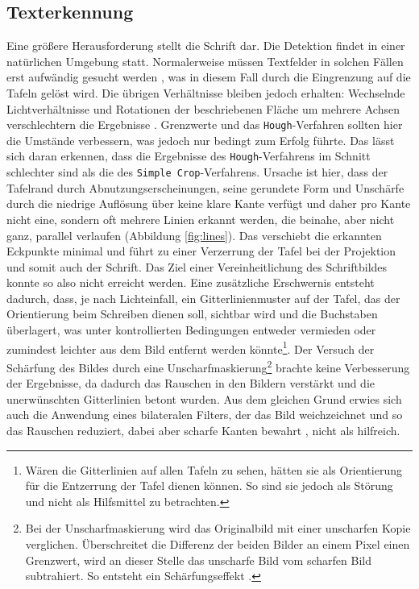 \subsection{Texterkennung}
\label{section:diskussiontexterkennung}
Eine größere Herausforderung stellt die Schrift dar.
Die Detektion findet in einer natürlichen Umgebung statt. Normalerweise müssen Textfelder in solchen Fällen erst aufwändig gesucht werden \cite{qixiangye}, was in diesem Fall durch die Eingrenzung auf die Tafeln gelöst wird. Die übrigen Verhältnisse bleiben jedoch erhalten: Wechselnde Lichtverhältnisse und Rotationen der beschriebenen Fläche um mehrere Achsen verschlechtern die Ergebnisse \cite{xilinchen}{} \cite{tesseractoptimum}. Grenzwerte und das \verb|Hough|-Verfahren sollten hier die Umstände verbessern, was jedoch nur bedingt zum Erfolg führte. Das lässt sich daran erkennen, dass die Ergebnisse des \verb|Hough|-Verfahrens im Schnitt schlechter sind als die des \verb|Simple Crop|-Verfahrens. Ursache ist hier, dass der Tafelrand durch Abnutzungserscheinungen, seine gerundete Form und Unschärfe durch die niedrige Auflösung über keine klare Kante verfügt und daher pro Kante nicht eine, sondern oft mehrere Linien erkannt werden, die beinahe, aber nicht ganz, parallel verlaufen (Abbildung \ref{fig:lines}). Das verschiebt die erkannten Eckpunkte minimal und führt zu einer Verzerrung der Tafel bei der Projektion und somit auch der Schrift. Das Ziel einer Vereinheitlichung des Schriftbildes konnte so also nicht erreicht werden. Eine zusätzliche Erschwernis entsteht dadurch, dass, je nach Lichteinfall, ein Gitterlinienmuster auf der Tafel, das der Orientierung beim Schreiben dienen soll, sichtbar wird und die Buchstaben überlagert, was unter kontrollierten Bedingungen entweder vermieden oder zumindest leichter aus dem Bild entfernt werden könnte\footnote{Wären die Gitterlinien auf allen Tafeln zu sehen, hätten sie als Orientierung für die Entzerrung der Tafel dienen können. So sind sie jedoch als Störung und nicht als Hilfsmittel zu betrachten.}.
Der Versuch der Schärfung des Bildes durch eine Unscharfmaskierung\footnote{Bei der Unscharfmaskierung wird das Originalbild mit einer unscharfen Kopie verglichen. Überschreitet die Differenz der beiden Bilder an einem Pixel einen Grenzwert, wird an dieser Stelle das unscharfe Bild vom scharfen Bild subtrahiert. So entsteht ein Schärfungseffekt \cite{gimpsharpening}.} brachte keine Verbesserung der Ergebnisse, da dadurch das Rauschen in den Bildern verstärkt und die unerwünschten Gitterlinien betont wurden. Aus dem gleichen Grund erwies sich auch die Anwendung eines bilateralen Filters, der das Bild weichzeichnet und so das Rauschen reduziert, dabei aber scharfe Kanten bewahrt \cite{tomasi}, nicht als hilfreich.\\
